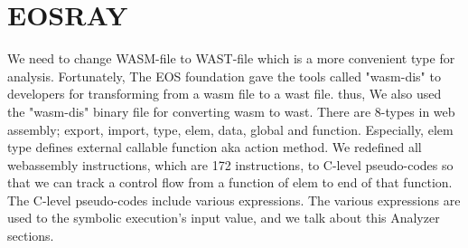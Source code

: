 \section{EOSRAY}
We need to change WASM-file to WAST-file which is a more convenient type for analysis. Fortunately, The EOS foundation gave the tools called "wasm-dis" to developers for transforming from a wasm file to a wast file. thus, We also used the "wasm-dis" binary file for converting wasm to wast. There are 8-types in web assembly; export, import, type, elem, data, global and function. Especially, elem type defines external callable function aka action method.  We redefined all webassembly instructions, which are 172 instructions, to C-level pseudo-codes so that we can track a control flow from a function of elem to end of that function. The C-level pseudo-codes include various expressions. The various expressions are used to the symbolic execution's input value, and we talk about this Analyzer sections.

